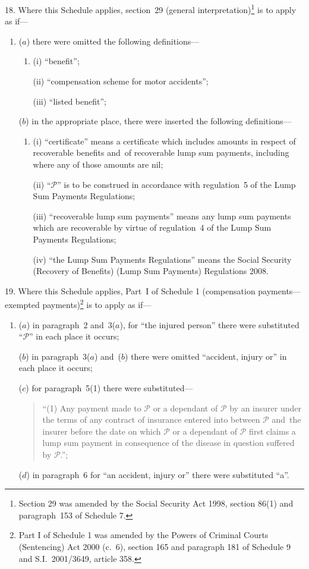 \documentclass[12pt,a4paper]{article}
\begin{document}
18.  Where this Schedule applies, section~29 (general interpretation)\footnote{Section 29 was amended by the Social Security Act 1998, section 86(1) and paragraph~153 of Schedule 7.} is to apply as if—
\begin{enumerate}\item[]
($a$) there were omitted the following definitions—
\begin{enumerate}\item[]
(i) “benefit”;

(ii) “compensation scheme for motor accidents”;

(iii) “listed benefit”;
\end{enumerate}

($b$) in the appropriate place, there were inserted the following definitions—
\begin{enumerate}\item[]
(i) “certificate” means a certificate which includes amounts in respect of recoverable benefits and~of recoverable lump sum payments, including where any of those amounts are nil;

(ii) “$\mathcal{P}$” is to be construed in accordance with regulation~5 of the Lump Sum Payments Regulations;

(iii) “recoverable lump sum payments” means any lump sum payments which are recoverable by virtue of regulation~4 of the Lump Sum Payments Regulations;

(iv) “the Lump Sum Payments Regulations” means the Social Security (Recovery of Benefits) (Lump Sum Payments) Regulations 2008.
\end{enumerate}
\end{enumerate}

\medskip

19.  Where this Schedule applies, Part~I of Schedule 1 (compensation payments---exempted payments)\footnote{Part I of Schedule 1 was amended by the Powers of Criminal Courts (Sentencing) Act 2000 (c.~6), section 165 and paragraph 181 of Schedule 9 and S.I.~2001/3649, article 358.} is to apply as if—
\begin{enumerate}\item[]
($a$) in paragraph~2 and~3($a$), for “the injured person” there were substituted “$\mathcal{P}$” in each place it occurs;

($b$) in paragraph~3($a$)  and~($b$)  there were omitted “accident, injury or” in each place it occurs;

($c$) for paragraph~5(1) there were substituted—
\begin{quotation}
“(1) Any payment made to $\mathcal{P}$ or a dependant of $\mathcal{P}$ by an insurer under the terms of any contract of insurance entered into between $\mathcal{P}$ and~the insurer before the date on which $\mathcal{P}$ or a dependant of $\mathcal{P}$ first claims a lump sum payment in consequence of the disease in question suffered by $\mathcal{P}$.”;
\end{quotation}

($d$) in paragraph~6 for “an accident, injury or” there were substituted “a”.
\end{enumerate}
\end{document}
